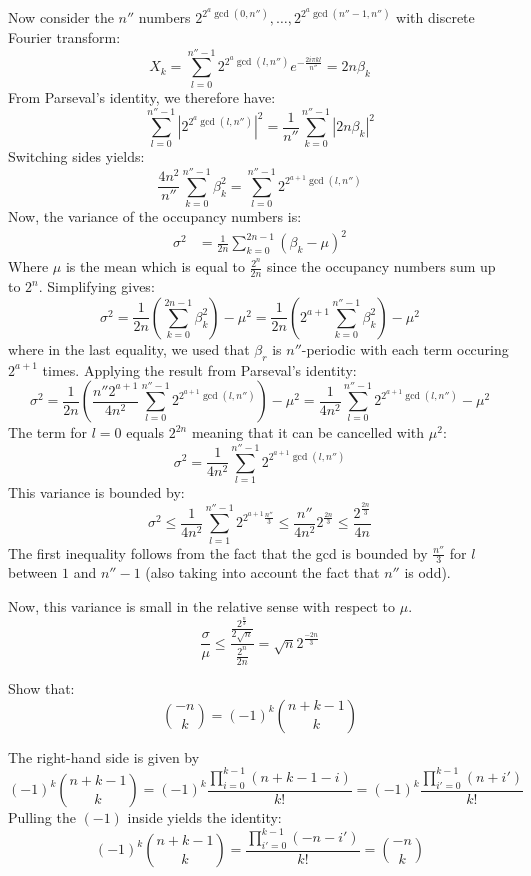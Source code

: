 \begin{solution}
\begin{enumerate}[label=(\alph*)]
        Now consider the $n''$ numbers $2^{2^a\gcd(0,n'')}, \ldots, 2^{2^a\gcd(n''-1,n'')}$ with discrete Fourier transform:
        \[
            X_k = \sum_{l=0}^{n''-1} 2^{2^a\gcd(l,n'')}e^{-\frac{2i\pi kl}{n''}} = 2n\beta_k
        \]
        From Parseval's identity, we therefore have:
        \[
            \sum_{l=0}^{n''-1} \left|2^{2^a\gcd(l,n'')}\right|^2 = \frac{1}{n''}\sum_{k=0}^{n''-1} |2n\beta_k|^2
        \]
        Switching sides yields:
        \[
            \frac{4n^2}{n''}\sum_{k=0}^{n''-1} \beta_k^2 = \sum_{l=0}^{n''-1} 2^{2^{a+1}\gcd(l,n'')}
        \]
        Now, the variance of the occupancy numbers is:
        \begin{align*}
            \sigma^2 &= \frac{1}{2n} \sum_{k=0}^{2n-1} (\beta_k - \mu)^2
        \end{align*}
        Where $\mu$ is the mean which is equal to $\frac{2^n}{2n}$ since the occupancy numbers sum up to $2^n$. Simplifying gives:
        \[
            \sigma^2 = \frac{1}{2n}\left(\sum_{k=0}^{2n-1} \beta_k^2\right) - \mu^2  = \frac{1}{2n}\left(2^{a+1}\sum_{k=0}^{n''-1} \beta_k^2\right) - \mu^2
        \]
        where in the last equality, we used that $\beta_r$ is $n''$-periodic with each term occuring $2^{a+1}$ times.
        Applying the result from Parseval's identity:
        \[
            \sigma^2 = \frac{1}{2n}\left(\frac{n''2^{a+1}}{4n^2} \sum_{l=0}^{n''-1} 2^{2^{a+1}\gcd(l,n'')}\right) - \mu^2 = \frac{1}{4n^2}\sum_{l=0}^{n''-1} 2^{2^{a+1}\gcd(l,n'')} - \mu^2
        \]
        The term for $l=0$ equals $2^{2n}$ meaning that it can be cancelled with $\mu^2$:
        \[
            \sigma^2 = \frac{1}{4n^2}\sum_{l=1}^{n''-1} 2^{2^{a+1}\gcd(l,n'')}
        \]
        This variance is bounded by:
        \[
            \sigma^2 \leq \frac{1}{4n^2} \sum_{l=1}^{n'' - 1} 2^{2^{a+1} \frac{n''}{3}} \leq \frac{n''}{4n^2} 2^{\frac{2n}{3}} \leq \frac{2^{\frac{2n}{3}}}{4n}
        \]
        The first inequality follows from the fact that the gcd is bounded by $\frac{n''}{3}$ for $l$ between $1$ and $n''-1$ (also taking into account the fact that $n''$ is odd).

        Now, this variance is small in the relative sense with respect to $\mu$.
        \[
            \frac{\sigma}{\mu} \leq \frac{\frac{2^{\frac{n}{3}}}{2\sqrt{n}}}{\frac{2^{n}}{2n}} = \sqrt{n}2^{\frac{-2n}{3}}
        \]
    \end{enumerate}
\end{solution}

\begin{exercise}
    Show that:
    \[
        \binom{-n}{k} = (-1)^k\binom{n+k-1}{k}
    \]
\end{exercise}
\begin{solution}
    The right-hand side is given by
    \[
        (-1)^k \binom{n+k-1}{k} = (-1)^k \frac{\prod_{i=0}^{k-1} (n+k-1-i)}{k!} = (-1)^k \frac{\prod_{i'=0}^{k-1} (n+i')}{k!}
    \]
    Pulling the $(-1)$ inside yields the identity:
    \[
        (-1)^k\binom{n+k-1}{k} = \frac{\prod_{i'=0}^{k-1} (-n-i')}{k!} = \binom{-n}{k}
    \]
\end{solution}

